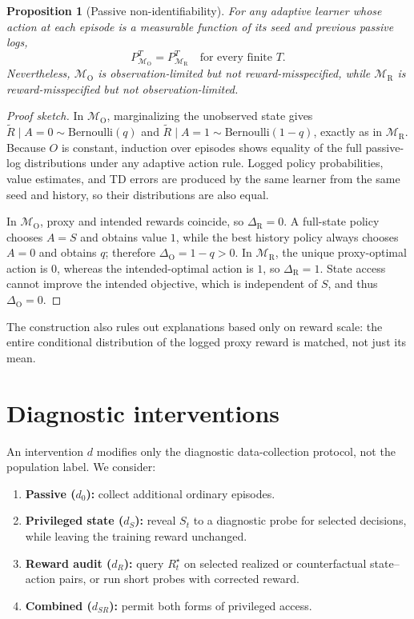 \documentclass[9pt,twocolumn]{extarticle}
\newtheorem{proposition}{Proposition}
\begin{document}
\begin{proposition}[Passive non-identifiability]
For any adaptive learner whose action at each episode is a measurable function
of its seed and previous passive logs,
\begin{equation}
P_{\mathcal M_{\mathrm O}}^T=P_{\mathcal M_{\mathrm R}}^T
\quad\text{for every finite }T.
\end{equation}
Nevertheless, $\mathcal M_{\mathrm O}$ is observation-limited but not
reward-misspecified, while $\mathcal M_{\mathrm R}$ is reward-misspecified but
not observation-limited.
\end{proposition}

\begin{proof}[Proof sketch]
In $\mathcal M_{\mathrm O}$, marginalizing the unobserved state gives
$\widetilde R\mid A=0\sim\mathrm{Bernoulli}(q)$ and
$\widetilde R\mid A=1\sim\mathrm{Bernoulli}(1-q)$, exactly as in
$\mathcal M_{\mathrm R}$. Because $O$ is constant, induction over episodes
shows equality of the full passive-log distributions under any adaptive action
rule. Logged policy probabilities, value estimates, and TD errors are produced
by the same learner from the same seed and history, so their distributions are
also equal.

In $\mathcal M_{\mathrm O}$, proxy and intended rewards coincide, so
$\Delta_{\mathrm R}=0$. A full-state policy chooses $A=S$ and obtains value
$1$, while the best history policy always chooses $A=0$ and obtains $q$;
therefore $\Delta_{\mathrm O}=1-q>0$. In $\mathcal M_{\mathrm R}$, the unique
proxy-optimal action is $0$, whereas the intended-optimal action is $1$, so
$\Delta_{\mathrm R}=1$. State access cannot improve the intended objective,
which is independent of $S$, and thus $\Delta_{\mathrm O}=0$.
\end{proof}

The construction also rules out explanations based only on reward scale: the
entire conditional distribution of the logged proxy reward is matched, not
just its mean.

\section{Diagnostic interventions}

An intervention $d$ modifies only the diagnostic data-collection protocol,
not the population label. We consider:
\begin{enumerate}[label=(\roman*)]
\item \textbf{Passive ($d_0$):} collect additional ordinary episodes.
\item \textbf{Privileged state ($d_S$):} reveal $S_t$ to a diagnostic probe for
selected decisions, while leaving the training reward unchanged.
\item \textbf{Reward audit ($d_R$):} query $R_t^\star$ on selected realized or
counterfactual state--action pairs, or run short probes with corrected reward.
\item \textbf{Combined ($d_{SR}$):} permit both forms of privileged access.
\end{enumerate}
\end{document}
